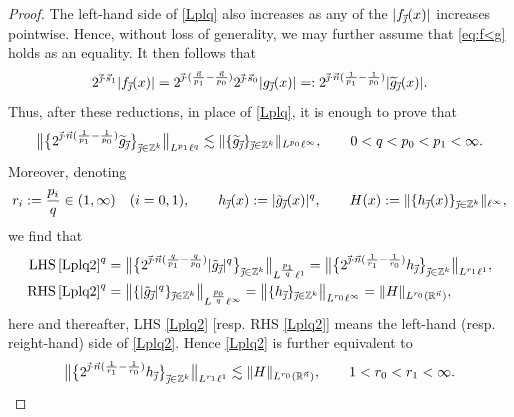 \documentclass[11pt, reqno]{amsart}
\theoremstyle{definition}
\theoremstyle{remark}
\numberwithin{equation}{section}
\newcommand{\R}{\mathbb R}
\newcommand{\Z}{\mathbb Z}
\newcommand{\vj}{\vec{\textit{\j}}}
\newcommand{\vn}{\vec n}
\newcommand{\vs}{\vec s}
\newcommand{\abs}[1]{|#1|}
\newcommand{\Norm}[2]{\|#1\|_{#2}}
\newcommand{\bNorm}[2]{\big\|#1\big\|_{#2}}
\begin{document}
\begin{proof}
The left-hand side of \eqref{Lplq} also increases as any of the $\abs{f_{\vj}(x)}$ increases pointwise. Hence, without loss of generality, we may further assume that \eqref{eq:f<g} holds as an equality. It then follows that
\begin{equation*}
  2^{\vj\cdot\vs_1}\abs{f_{\vj}(x)}
  =2^{\vj\cdot(\frac{\vn}{p_1}-\frac{\vn}{p_0})}2^{\vj\cdot\vs_0}\abs{g_{\vj}(x)}
  =:2^{\vj\cdot\vn(\frac{1}{p_1}-\frac{1}{p_0})}\abs{\widetilde g_{\vj}(x)}.
\end{equation*}
Thus, after these reductions, in place of \eqref{Lplq}, it is enough to prove that
\begin{equation}\label{Lplq2}
  \bNorm{\big\{ 2^{\vj\cdot\vn (\frac{1}{p_1}-\frac{1}{p_0})} \widetilde g_{\vj} \big\}_{\vj\in\Z^k} }{L^{p_1}\ell^q}
  \lesssim \Norm{\{ \widetilde g_{\vj} \}_{\vj\in\Z^k} }{L^{p_0}\ell^\infty},\qquad
  0<q<p_0<p_1<\infty.
\end{equation}
Moreover, denoting
\begin{equation*}
    r_i:=\frac{p_i}{q}\in(1,\infty)\quad(i=0,1),\qquad h_{\vj}(x):=\abs{\tilde g_{\vj}(x)}^q,\qquad
    H(x):=\Norm{\{  h_{\vj}(x) \}_{\vj\in\Z^k} }{\ell^\infty},
\end{equation*}
we find that
\begin{equation*}
\begin{split}
  \operatorname{LHS}\eqref{Lplq2}^q
  &= \bNorm{\big\{ 2^{\vj\cdot\vn(\frac{q}{p_1}-\frac{q}{p_0})} \abs{\tilde g_{\vj}}^q \big\}_{\vj\in\Z^k} }{L^{\frac{p_1}{q}}\ell^1}
  = \bNorm{\big\{ 2^{\vj\cdot\vn(\frac{1}{r_1}-\frac{1}{r_0})} h_{\vj} \big\}_{\vj\in\Z^k} }{L^{r_1}\ell^1}, \\
  \operatorname{RHS}\eqref{Lplq2}^q
  &= \bNorm{\{  \abs{\tilde g_{\vj}}^q \}_{\vj\in\Z^k} }{L^{\frac{p_0}{q}}\ell^\infty}
  = \bNorm{\{  h_{\vj} \}_{\vj\in\Z^k} }{L^{r_0}\ell^\infty}  =  \Norm{H}{L^{r_0}(\R^{\vn})},
\end{split}
\end{equation*}
here and thereafter, LHS \eqref{Lplq2} [resp. RHS \eqref{Lplq2}] means the left-hand
(resp. reight-hand) side of \eqref{Lplq2}.
Hence \eqref{Lplq2} is further equivalent to
\begin{equation}\label{Lplq3}
  \bNorm{\big\{ 2^{\vj\cdot\vn(\frac{1}{r_1}-\frac{1}{r_0})} h_{\vj} \big\}_{\vj\in\Z^k} }{L^{r_1}\ell^1}
  \lesssim\Norm{H}{L^{r_0}(\R^{\vn})},\qquad 1<r_0<r_1<\infty.
\end{equation}


\end{proof}
\end{document}
